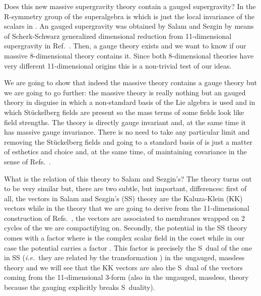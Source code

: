 \documentclass[12pt,a4paper]{article}
\begin{document}
Does this new massive supergravity theory contain a gauged
supergravity?  In \coordHE{} the R-symmetry group of the superalgebra is
\coordHE{} which is just the local invariance of the scalars in
\coordHE{}. An \coordHE{}  \coordHE{} gauged
supergravity was obtained by Salam and Sezgin by means of
Scherk-Schwarz generalized dimensional reduction \cite{kn:SS} from
11-dimensional supergravity in Ref.~\cite{kn:SS}. Then, a gauge theory
exists and we want to know if our massive 8-dimensional theory
contains it. Since both 8-dimensional theories have very different
11-dimensional origins this is a non-trivial test of our ideas.

We are going to show that indeed the massive theory contains a gauge
theory but we are going to go further: the massive theory is really
nothing but an \coordHE{} gauged theory in disguise in which a
non-standard basis of the \coordHE{} Lie algebra is used and in which
St\"uckelberg fields are present so the mass terms of some fields look
like field strengths. The theory is directly \coordHE{} gauge invariant
and, at the same time it has massive gauge invariance. There is no
need to take any particular limit and removing the St\"uckelberg
fields and going to a standard basis of \coordHE{} is just a matter of
esthetics and choice and, at the same time, of maintaining
\coordHE{} covariance in the sense of
Refs.~\cite{kn:MO,kn:KM}.

What is the relation of this theory to Salam and Sezgin's? The theory
turns out to be very similar but, there are two subtle, but important,
differences: first of all, the \coordHE{} vectors in Salam and Sezgin's
(SS) theory are the Kaluza-Klein (KK) vectors while in the theory that
we are going to derive from the 11-dimensional construction of
Refs.~\cite{kn:BLO,kn:MO}, the \coordHE{} vectors are associated to
membranes wrapped on 2 cycles of the \coordHE{} we are compactifying on.
Secondly, the potential in the SS theory comes with a factor
\coordHE{} where \myHighlight{$\tau$}\coordHE{} is the complex scalar field in the
\coordHE{} coset while in our case the potential carries
a factor \coordHE{}. This factor is precisely the
S~dual of the one in SS ({\em i.e.}~they are related by the
\coordHE{} transformation \coordHE{}) in the
ungauged, massless theory and we will see that the KK vectors are also
the S~dual of the vectors coming from the 11-dimensional 3-form (also
in the ungauged, massless, theory because the gauging explicitly
breaks S~duality).
\end{document}
